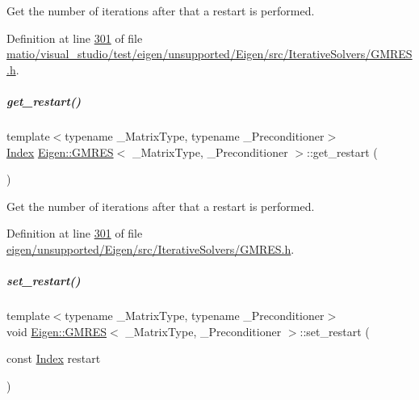 Get the number of iterations after that a restart is performed. 

Definition at line \hyperlink{matio_2visual__studio_2test_2eigen_2unsupported_2_eigen_2src_2_iterative_solvers_2_g_m_r_e_s_8h_source_l00301}{301} of file \hyperlink{matio_2visual__studio_2test_2eigen_2unsupported_2_eigen_2src_2_iterative_solvers_2_g_m_r_e_s_8h_source}{matio/visual\+\_\+studio/test/eigen/unsupported/\+Eigen/src/\+Iterative\+Solvers/\+G\+M\+R\+E\+S.\+h}.

\mbox{\label{group___iterative_linear_solvers___module_ade721328e58ace2d4493cbdcbe53ad09}} 
\subparagraph{\texorpdfstring{get\+\_\+restart()}{get\_restart()}\hspace{0.1cm}{\footnotesize\ttfamily [2/2]}}
{\footnotesize\ttfamily template$<$typename \+\_\+\+Matrix\+Type, typename \+\_\+\+Preconditioner$>$ \\
\hyperlink{namespace_eigen_a62e77e0933482dafde8fe197d9a2cfde}{Index} \hyperlink{group___iterative_linear_solvers___module_class_eigen_1_1_g_m_r_e_s}{Eigen\+::\+G\+M\+R\+ES}$<$ \+\_\+\+Matrix\+Type, \+\_\+\+Preconditioner $>$\+::get\+\_\+restart (\begin{DoxyParamCaption}{ }\end{DoxyParamCaption})\hspace{0.3cm}{\ttfamily [inline]}}

Get the number of iterations after that a restart is performed. 

Definition at line \hyperlink{eigen_2unsupported_2_eigen_2src_2_iterative_solvers_2_g_m_r_e_s_8h_source_l00301}{301} of file \hyperlink{eigen_2unsupported_2_eigen_2src_2_iterative_solvers_2_g_m_r_e_s_8h_source}{eigen/unsupported/\+Eigen/src/\+Iterative\+Solvers/\+G\+M\+R\+E\+S.\+h}.

\mbox{\label{group___iterative_linear_solvers___module_ac50d6bbca4a8a275861770feb211900d}} 
\subparagraph{\texorpdfstring{set\+\_\+restart()}{set\_restart()}\hspace{0.1cm}{\footnotesize\ttfamily [1/2]}}
{\footnotesize\ttfamily template$<$typename \+\_\+\+Matrix\+Type, typename \+\_\+\+Preconditioner$>$ \\
void \hyperlink{group___iterative_linear_solvers___module_class_eigen_1_1_g_m_r_e_s}{Eigen\+::\+G\+M\+R\+ES}$<$ \+\_\+\+Matrix\+Type, \+\_\+\+Preconditioner $>$\+::set\+\_\+restart (\begin{DoxyParamCaption}\item[{const \hyperlink{namespace_eigen_a62e77e0933482dafde8fe197d9a2cfde}{Index}}]{restart }\end{DoxyParamCaption})\hspace{0.3cm}{\ttfamily [inline]}}

